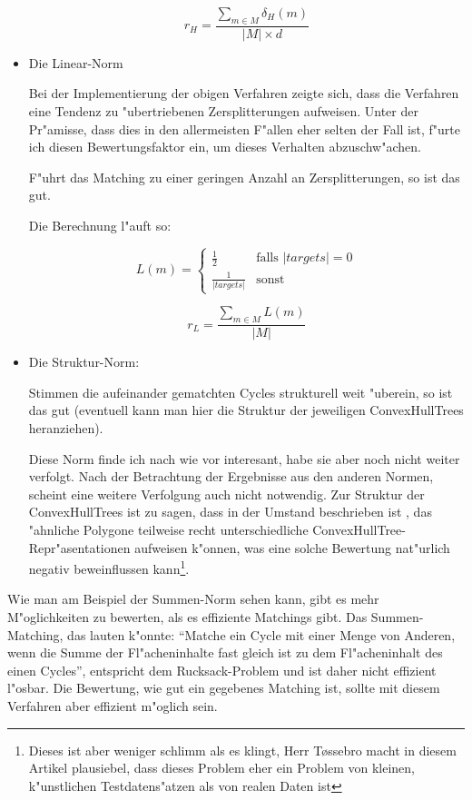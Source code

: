 \documentclass[a4paper,10pt,twoside]{scrreprt}
\begin{document}
\begin{itemize}
$$r_H=\frac{\sum_{m\in M}\delta_H(m)}{|M|\times d}$$


\item Die Linear-Norm

Bei der Implementierung der obigen Verfahren zeigte sich, dass die Verfahren eine Tendenz zu "ubertriebenen Zersplitterungen aufweisen. Unter der Pr"amisse, dass dies in den allermeisten F"allen eher selten der Fall ist, f"urte ich diesen Bewertungsfaktor ein, um dieses Verhalten abzuschw"achen.

F"uhrt das Matching zu einer geringen Anzahl an Zersplitterungen, so ist das gut.

Die Berechnung l"auft so:




$$L(m)=
\begin{cases}
	\frac{1}{2} & \text{falls }|targets|=0\\
	\frac{1}{|targets|} & \text{sonst}
    \end{cases}
$$

$$r_L=\frac{\sum_{m\in M}L(m)}{|M|}$$

\item Die Struktur-Norm:

Stimmen die aufeinander gematchten Cycles strukturell weit "uberein, so ist das gut (eventuell kann man hier die Struktur der jeweiligen ConvexHullTrees heranziehen).

Diese Norm finde ich nach wie vor interesant, habe sie aber noch nicht weiter verfolgt. Nach der Betrachtung der Ergebnisse aus den anderen Normen, scheint eine weitere Verfolgung auch nicht notwendig. Zur Struktur der ConvexHullTrees ist zu sagen, dass in \cite{TG} der Umstand beschrieben ist , das "ahnliche Polygone teilweise recht unterschiedliche ConvexHullTree-Repr"asentationen aufweisen k"onnen, was eine solche Bewertung nat"urlich negativ beweinflussen kann\footnote{Dieses ist aber weniger schlimm als es klingt, Herr T\o{}ssebro macht in diesem Artikel plausiebel, dass dieses Problem eher ein Problem von kleinen, k"unstlichen Testdatens"atzen als von realen Daten ist}.


\end{itemize} 

Wie man am Beispiel der Summen-Norm sehen kann, gibt es mehr M"oglichkeiten zu bewerten, als es effiziente Matchings gibt. Das Summen-Matching, das lauten k"onnte: "`Matche ein Cycle mit  einer Menge von Anderen, wenn die Summe der Fl"acheninhalte fast gleich ist zu dem Fl"acheninhalt des einen Cycles"', entspricht dem Rucksack-Problem und ist daher nicht effizient l"osbar. Die Bewertung, wie gut ein gegebenes Matching ist, sollte mit diesem Verfahren aber effizient m"oglich sein.



\end{document}
